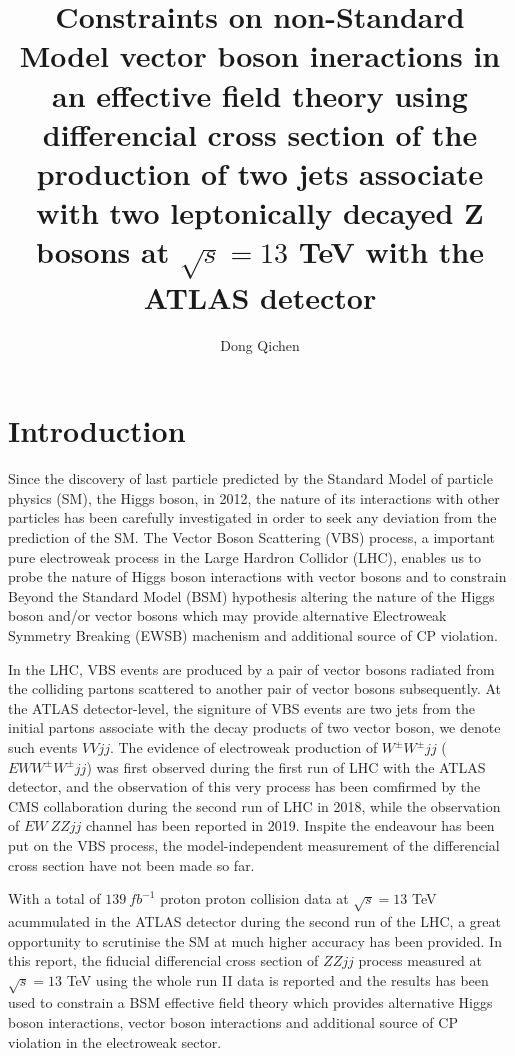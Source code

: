 \documentclass[a4paper,12pt]{article}
\title{\boldmath Constraints on non-Standard Model vector boson ineractions 
		in an effective field theory using differencial cross section of the production 
		of two jets associate with two leptonically decayed Z bosons at 
		$\sqrt{s} = 13$ TeV with the ATLAS detector}
\author{Dong Qichen}
\affiliation{The University of Manchester,\\316 Oxford Road, UK}
\begin{document}
 
	\maketitle
	\flushbottom

	\section{Introduction}
	\label{sec:intro}
		\par Since the discovery of last particle predicted by the Standard Model 
		of particle physics (SM)\cite{Gaillard_1999}, the Higgs boson, in 2012\cite{Aad_2012}, 
		the nature of its interactions with other particles has been carefully investigated in order 
		to seek any deviation from the prediction of the SM. The Vector Boson 
		Scattering (VBS) process\cite{rauch2016vectorboson}, a important pure 
		electroweak process in the Large Hardron Collidor (LHC)\cite{Evans_2008}, 
		enables us to probe the nature of Higgs 
		boson interactions with vector bosons and to constrain Beyond the Standard 
		Model (BSM) hypothesis altering the nature of the Higgs boson and/or vector bosons
		which may provide alternative Electroweak Symmetry Breaking (EWSB) 
		machenism\cite{dawson1999introduction} and additional source of CP 
		violation\cite{peccei1995cp}.
		
		\noindent\par In the LHC, VBS events are produced by a pair of vector bosons radiated 
		from the colliding partons scattered to another pair of vector bosons subsequently.
		At the ATLAS detector-level, the signiture of VBS events are two jets from the 
		initial partons associate with the decay products of two vector boson, we denote such 
		events $VVjj$. The evidence of electroweak production of $W^{\pm}W^{\pm}jj$
		($EW W^{\pm}W^{\pm}jj$) was first observed during the first run of LHC with the 
		ATLAS detector\cite{Aad_2014}, and the observation of this very process has been 
		comfirmed by the CMS\cite{Chatrchyan:2008aa} collaboration during the second 
		run of LHC in 2018\cite{Sirunyan_2018}, while the observation of $EW\ ZZjj$ channel 
		has been reported in 2019\cite{ATLAS-CONF-2019-033}. Inspite the endeavour 
		has been put on the VBS process, the model-independent measurement of the differencial 
		cross section have not been made so far.

		\par With a total of $139\ fb^{-1}$ proton proton collision data at 
		$\sqrt{s} = 13$ TeV acummulated in the ATLAS detector\cite{Aad:2008zzm} 
		during the second run of the LHC,
		a great opportunity to scrutinise the SM at much higher accuracy has been provided.
		In this report, the fiducial differencial cross section of $ZZjj$ process measured at 
		$\sqrt{s} = 13$ TeV using the whole run II data is reported and the results has 
		been used to constrain a BSM effective field theory\cite{Brivio_2017} which provides 
		alternative Higgs boson interactions, vector boson interactions and additional 
		source of CP violation in the electroweak sector.
\end{document}
